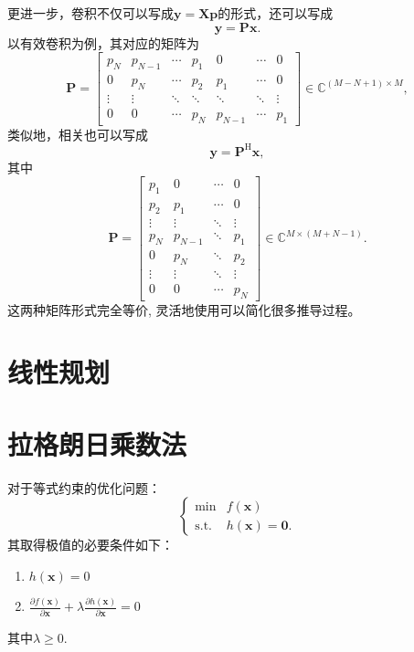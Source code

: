 更进一步，卷积不仅可以写成\( \bm{y} = \mathbf{X} \bm{p} \)的形式，还可以写成
\[
    \bm{y} = \mathbf{P} \bm{x}.
\]
以有效卷积为例，其对应的矩阵为
\[
    \mathbf{P} =
    \begin{bmatrix}
        p_N    & p_{N-1} & \cdots & p_1    & 0       & \cdots & 0      \\
        0      & p_N     & \cdots & p_2    & p_1     & \cdots & 0      \\
        \vdots & \vdots  & \ddots & \ddots & \ddots  & \ddots & \vdots \\
        0      & 0       & \cdots & p_N    & p_{N-1} & \cdots & p_1
    \end{bmatrix}
    \in \mathbb{C}^{(M-N+1) \times M},
\]
类似地，相关也可以写成
\[
    \bm{y} = \mathbf{P}^{\mathrm{H}} \bm{x},
\]
其中
\[
    \mathbf{P} =
    \begin{bmatrix}
        p_1    & 0       & \cdots & 0      \\
        p_2    & p_1     & \cdots & 0      \\
        \vdots & \vdots  & \ddots & \vdots \\
        p_N    & p_{N-1} & \ddots & p_1    \\
        0      & p_N     & \ddots & p_2    \\
        \vdots & \vdots  & \ddots & \vdots \\
        0      & 0       & \cdots & p_N
    \end{bmatrix}
    \in \mathbb{C}^{M \times (M+N-1)}.
\]
这两种矩阵形式完全等价, 灵活地使用可以简化很多推导过程。

\section{线性规划}


\section{拉格朗日乘数法}\label{apx.lagrange-multiplier}
对于等式约束的优化问题：
\[
    \begin{cases}
        \min          & f(\bm{x})           \\
        \mathrm{s.t.} & h(\bm{x}) = \bm{0}.
    \end{cases}
\]
其取得极值的必要条件如下：
\begin{enumerate}
    \item \( h(\bm{x}) = 0 \)
    \item \( \frac{\partial f(\bm{x})}{\partial \bm{x}} + \lambda \frac{\partial h(\bm{x})}{\partial \bm{x}} = 0 \)
\end{enumerate}
其中\( \lambda \geq 0 \).

